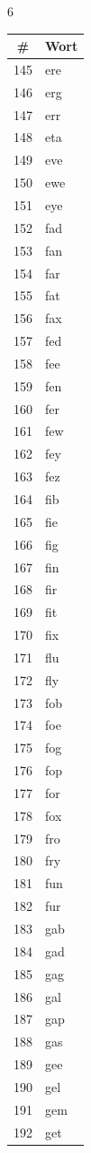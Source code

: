 \documentclass[11pt,a4paper]{article}
\begin{document}
\begin{multicols}{6}
\columnbreak

\begin{tabular}{cl}
\toprule
\# & Wort \\
\midrule
145 & ere \\
146 & erg \\
147 & err \\
148 & eta \\
149 & eve \\
150 & ewe \\
151 & eye \\
152 & fad \\
153 & fan \\
154 & far \\
155 & fat \\
156 & fax \\
157 & fed \\
158 & fee \\
159 & fen \\
160 & fer \\
161 & few \\
162 & fey \\
163 & fez \\
164 & fib \\
165 & fie \\
166 & fig \\
167 & fin \\
168 & fir \\
169 & fit \\
170 & fix \\
171 & flu \\
172 & fly \\
173 & fob \\
174 & foe \\
175 & fog \\
176 & fop \\
177 & for \\
178 & fox \\
179 & fro \\
180 & fry \\
181 & fun \\
182 & fur \\
183 & gab \\
184 & gad \\
185 & gag \\
186 & gal \\
187 & gap \\
188 & gas \\
189 & gee \\
190 & gel \\
191 & gem \\
192 & get \\
\bottomrule
\end{tabular}


\end{multicols}
\end{document}
